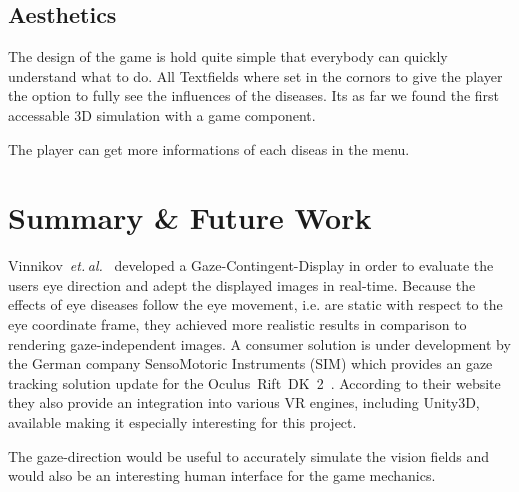 \documentclass{acm_proc_article-sp}
\newcommand{\etal}{\textit{et. al.}}
\begin{document}
\subsection{Aesthetics}
The design of the game is hold quite simple that everybody can quickly understand what to do. All Textfields where set in the cornors to give the player the option to fully see the influences of the diseases. Its as far we found the first accessable 3D simulation with a game component.

The player can get more informations of each diseas in the menu.

%
%
\section{Summary \& Future Work}
Vinnikov \etal \cite{gazedisplays} developed a Gaze-Contingent-Display in order to evaluate the users eye direction and adept the displayed images in real-time.
Because the effects of eye diseases follow the eye movement, i.e. are static with respect to the eye coordinate frame, they achieved more realistic results in comparison to rendering gaze-independent images.
A consumer solution is under development by the German company SensoMotoric Instruments (SIM) which provides an gaze tracking solution update for the Oculus Rift DK 2 \cite{smi-oculus, arstechoculus}.
According to their website they also provide an integration into various VR engines, including Unity3D, available making it especially interesting for this project.

The gaze-direction would be useful to accurately simulate the vision fields and would also be an interesting human interface for the game mechanics.
%
\printbibliography

\balancecolumns
\end{document}
